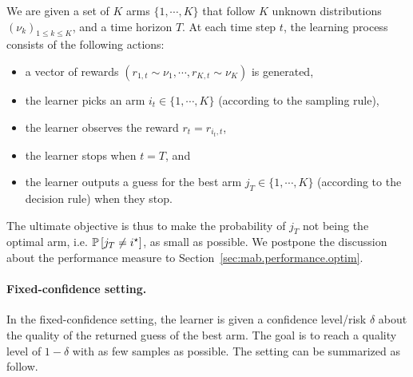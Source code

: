 \begin{definition}\label{def:mab.bai_budget}
\begin{leftbar}[defnbar]
	We are given a set of $K$ arms $\{1,\cdots,K\}$ that follow $K$ unknown distributions $(\nu_k)_{1 \leq k \leq K}$, and a time horizon $T$. At each time step $t$, the learning process consists of the following actions:
\begin{itemize}
	\item a vector of rewards $(r_{1,t} \sim \nu_1, \cdots, r_{K,t} \sim \nu_K)$ is generated,
	\item the learner picks an arm $i_t \in \{1,\cdots,K\}$ (according to the sampling rule),
	\item the learner observes the reward $r_t = r_{i_t, t}$,
	\item the learner stops when $t=T$, and
	\item the learner outputs a guess for the best arm $j_T \in \{1,\cdots,K\}$ (according to the decision rule) when they stop.
\end{itemize}
\end{leftbar}
\end{definition}

The ultimate objective is thus to make the probability of $j_T$ not being the optimal arm, i.e. $\mathbb{P}\left[j_T\neq i^{\star}\right]$, as small as possible. We postpone the discussion about the performance measure to Section~\ref{sec:mab.performance.optim}.

\paragraph{Fixed-confidence setting.}

In the fixed-confidence setting, the learner is given a confidence level/risk $\delta$ about the quality of the returned guess of the best arm. The goal is to reach a quality level of $1-\delta$ with as few samples as possible. The setting can be summarized as follow.

